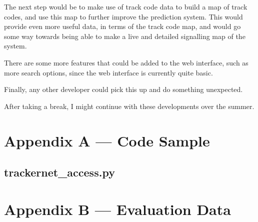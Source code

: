 \documentclass[a4paper,12pt]{report}
\begin{document}
The next step would be to make use of track code data to build a map of track
codes, and use this map to further improve the prediction system. This would
provide even more useful data, in terms of the track code map, and would go
some way towards being able to make a live and detailed signalling map of the
system.

There are some more features that could be added to the web interface, such as
more search options, since the web interface is currently quite basic.

Finally, any other developer could pick this up and do something unexpected.

After taking a break, I might continue with these developments over the summer.

\pagebreak





\chapter*{Appendix A --- Code Sample}

\section*{trackernet\_access.py}



\chapter*{Appendix B --- Evaluation Data}


\end{document}
